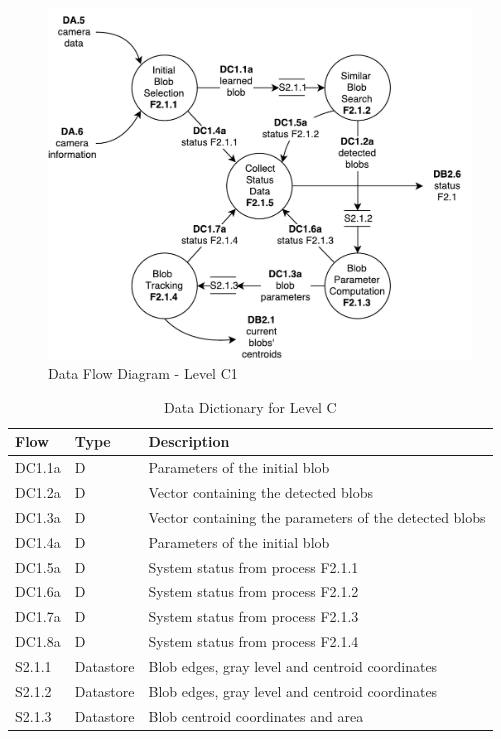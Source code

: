 \begin{figure}[!htb]
	\centering
	\includegraphics[width=\textwidth]{content/chapter_03/images/sa_diagram_06.pdf}
	\caption{Data Flow Diagram - Level C1}
	\label{fig:sa_diag_06}
\end{figure}

\begin{table}[!htb]
	\centering
	\begin{tabular}{lll}
		\toprule
		Flow & Type & Description \\
		\midrule
		DC1.1a & D & Parameters of the initial blob \\
		DC1.2a & D & Vector containing the detected blobs \\
		DC1.3a & D & Vector containing the parameters of the detected blobs \\
		DC1.4a & D & Parameters of the initial blob \\
		DC1.5a & D & System status from process F2.1.1 \\
		DC1.6a & D & System status from process F2.1.2 \\
		DC1.7a & D & System status from process F2.1.3 \\
		DC1.8a & D & System status from process F2.1.4 \\
		\midrule
		S2.1.1 & Datastore & Blob edges, gray level and centroid coordinates \\
		S2.1.2 & Datastore & Blob edges, gray level and centroid coordinates \\
		S2.1.3 & Datastore & Blob centroid coordinates and area \\
		\bottomrule
	\end{tabular}
	\caption{Data Dictionary for Level C}
	\label{tab:DD-LC}
\end{table}